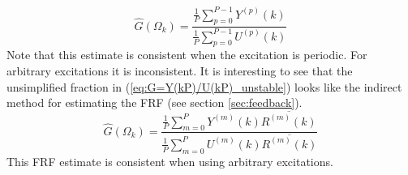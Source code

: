 \begin{equation*}
    \hat G(\Omega_k) = \frac{\frac{1}{P}\sum_{p=0}^{P-1}  Y^{(p)}(k)}{\frac{1}{P}\sum_{p=0}^{P-1}  U^{(p)}(k)}
\end{equation*}
Note that this estimate is consistent when the excitation is periodic. For arbitrary excitations it is inconsistent. It is interesting to see that the unsimplified fraction in (\ref{eq:G=Y(kP)/U(kP)_unstable}) looks like the indirect method for estimating the FRF (see section \ref{sec:feedback}).
\begin{equation*}
    \hat G(\Omega_k) = \frac{ \frac{1}{P}\sum_{m=0}^P Y^{(m)}(k) \overline{R^{(m)}(k)} } { \frac{1}{P}\sum_{m=0}^P U^{(m)}(k) \overline{R^{(m)}(k)} }
\end{equation*}
This FRF estimate is consistent when using arbitrary excitations.